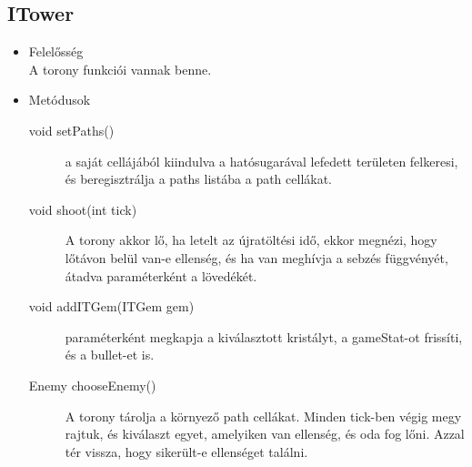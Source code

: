 \subsection{ITower}
\begin{itemize}
\item Felelősség\\
A torony funkciói vannak benne.
\item Metódusok\\
	\begin{description}
		\item[void setPaths()] a saját cellájából kiindulva a hatósugarával lefedett területen felkeresi, és beregisztrálja a paths listába a path cellákat.
\item[void shoot(int tick)] A torony akkor lő, ha letelt az újratöltési idő, ekkor megnézi, hogy lőtávon belül van-e ellenség, és ha van meghívja a sebzés függvényét, átadva paraméterként a lövedékét. 
\item[void addITGem(ITGem gem)] paraméterként megkapja a kiválasztott kristályt, a gameStat-ot frissíti, és a bullet-et is.
\item[Enemy chooseEnemy()] A torony tárolja a környező path cellákat. Minden tick-ben végig megy rajtuk, és kiválaszt egyet, amelyiken van ellenség, és oda fog lőni. Azzal tér vissza, hogy sikerült-e ellenséget találni.

		
		
	\end{description}
\end{itemize}
